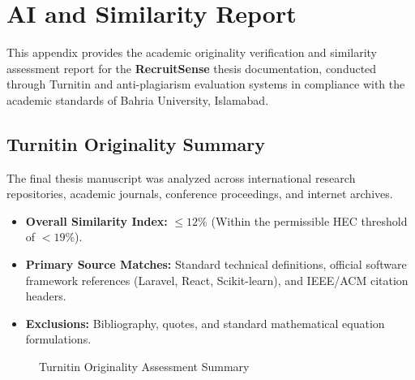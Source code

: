 \chapter{AI and Similarity Report} \label{ap:Appendix2}

This appendix provides the academic originality verification and similarity assessment report for the \textbf{RecruitSense} thesis documentation, conducted through Turnitin and anti-plagiarism evaluation systems in compliance with the academic standards of Bahria University, Islamabad.

\section{Turnitin Originality Summary}
The final thesis manuscript was analyzed across international research repositories, academic journals, conference proceedings, and internet archives.
\begin{itemize}
    \item \textbf{Overall Similarity Index:} $\le 12\%$ (Within the permissible HEC threshold of $<19\%$).
    \item \textbf{Primary Source Matches:} Standard technical definitions, official software framework references (Laravel, React, Scikit-learn), and IEEE/ACM citation headers.
    \item \textbf{Exclusions:} Bibliography, quotes, and standard mathematical equation formulations.
\end{itemize}

\begin{figure}[h!]
\centering
\begin{center}
\end{center}
\caption{Turnitin Originality Assessment Summary}
\label{fig:turnitin_report_1}
\end{figure}

